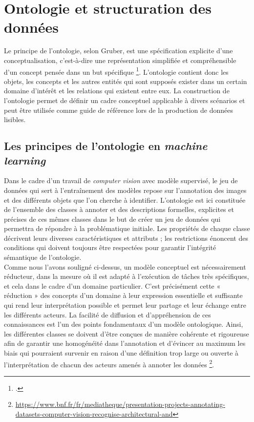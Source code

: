 \documentclass[12pt,twoside]{book}
\begin{document}
\newpage
\section{Ontologie et structuration des données}

Le principe de l’ontologie, selon Gruber, est une spécification explicite d'une conceptualisation, c’est-à-dire une représentation simplifiée et compréhensible d'un concept pensée dans un but spécifique \footcite{gruber_translation_1993}. L’ontologie contient donc les objets, les concepts et les autres entités qui sont supposés exister dans un certain domaine d'intérêt et les relations qui existent entre eux. La construction de l’ontologie permet de définir un cadre conceptuel applicable à divers scénarios et peut être utilisée comme guide de référence lors de la production de données lisibles. 

\subsection{Les principes de l’ontologie en \textit{machine learning}}

Dans le cadre d’un travail de \textit{computer vision} avec modèle supervisé, le jeu de données qui sert à l’entraînement des modèles repose sur l’annotation des images et des différents objets que l’on cherche à identifier. L’ontologie est ici constituée de l’ensemble des classes à annoter et des descriptions formelles, explicites et précises de ces mêmes classes dans le but de créer un jeu de données qui permettra de répondre à la problématique initiale. Les propriétés de chaque classe décrivent leurs diverses caractéristiques et attributs ; les restrictions énoncent des conditions qui doivent toujours être respectées pour garantir l’intégrité sémantique de l’ontologie. \\

Comme nous l’avons souligné ci-dessus, un modèle conceptuel est nécessairement réducteur, dans la mesure où il est adapté à l’exécution de tâches très spécifiques, et cela dans le cadre d’un domaine particulier. C’est précisément cette « réduction » des concepts d’un domaine à leur expression essentielle et suffisante qui rend leur interprétation possible et permet leur partage et leur échange entre les différents acteurs. La facilité de diffusion et d'appréhension de ces connaissances est l’un des points fondamentaux d’un modèle ontologique. Ainsi, les différentes classes se doivent d’être conçues de manière cohérente et rigoureuse afin de garantir une homogénéité dans l’annotation et d’évincer au maximum les biais qui pourraient survenir en raison d’une définition trop large ou ouverte à l’interprétation de chacun des acteurs amenés à annoter les données \footnote{\url{https://www.bnf.fr/fr/mediatheque/presentation-projects-annotating-datasets-computer-vision-recognise-architectural-and}}. 
\end{document}
